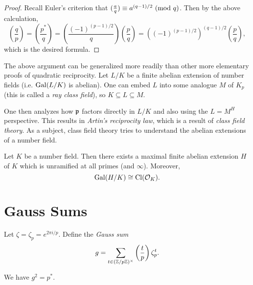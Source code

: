 \begin{proof}
  Recall Euler's criterion that
  $(\frac{a}{q}) \equiv a^{(q - 1) / 2} \ (\mathrm{mod}\ q)$.
  Then by the above calculation,
  \[
    \left(\frac{q}{p}\right)
    = \left(\frac{p^*}{q}\right)
    = \left(\frac{(-1)^{(p - 1) / 2}}{q}\right)
    \left(\frac{p}{q}\right)
    = ((-1)^{(p - 1) / 2})^{(q - 1) / 2}
    \left(\frac{p}{q}\right),
  \]
  which is the desired formula.
\end{proof}

\begin{remark}
  The above argument can be generalized more
  readily than other more elementary proofs of
  quadratic reciprocity.
  Let $L / K$ be a finite
  abelian extension of number fields (i.e.
  $\operatorname{Gal}(L / K)$ is abelian).
  One can embed $L$
  into some analogue $M$ of $K_p$ (this is called a
  \emph{ray class field}), so
  $K \subseteq L \subseteq M$.

  One then analyzes
  how $\mathfrak{p}$ factors directly in $L / K$ and also
  using the $L = M^H$ perspective.
  This results in
  \emph{Artin's reciprocity law}, which
  is a result of \emph{class field theory}.
  As a subject, class field theory
  tries to understand the abelian extensions of a
  number field.
\end{remark}

\begin{theorem}[Hilbert]
  Let $K$ be a number field. Then there exists a
  maximal finite abelian extension $H$ of $K$ which is
  unramified at all primes (and $\infty$). Moreover,
  \[
    \operatorname{Gal}(H / K) \cong \operatorname{Cl}(\mathcal{O}_K).
  \]
\end{theorem}

\section{Gauss Sums}

\begin{definition}
  Let $\zeta = \zeta_p = e^{2\pi i / p}$. Define the
  \emph{Gauss sum}
  \[
    g = \sum_{t \in (\mathbb{Z} / p\mathbb{Z})^\times} \left(\frac{t}{p}\right) \zeta_p^t.
  \]
\end{definition}

\begin{lemma}
  We have $g^2 = p^*$.
\end{lemma}

